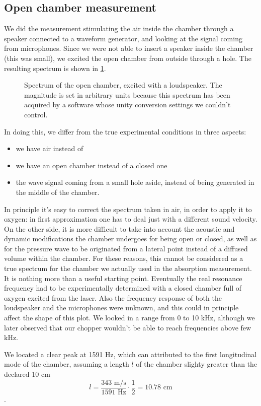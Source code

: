 	\subsection{Open chamber measurement}
We did the measurement stimulating the air inside the chamber through a speaker connected to a waveform generator, and looking at the signal coming from microphones. Since we were not able to insert a speaker inside the chamber (this was small), we excited the open chamber from outside through a hole. The resulting spectrum is shown in \cref{chamberplot}.
\begin{figure}[!t]\centering

\caption{Spectrum of the open chamber, excited with a loudspeaker. The magnitude is set in arbitrary units because this spectrum has been acquired by a software whose unity conversion settings we couldn't control.}
\label{chamberplot}
\end{figure}
In doing this, we differ from the true experimental conditions in three aspects:
\begin{itemize}
\item we have air instead of 
\item we have an open chamber instead of a closed one 
\item the wave signal coming from a small hole aside, instead of being generated in the middle of the chamber.
\end{itemize}

In principle it's easy to correct the spectrum taken in air, in order to apply it to oxygen: in first approximation one has to deal just with a different sound velocity. On the other side, it is more difficult to take into account the acoustic and dynamic modifications the chamber undergoes for being open or closed, as well as for the pressure wave to be originated from a lateral point instead of a diffused volume within the chamber. For these reasons, this cannot be considered as a true spectrum for the chamber we actually used in the absorption measurement. It is nothing more than a useful starting point. Eventually the real resonance frequency had to be experimentally determined with a closed chamber full of oxygen excited from the laser. Also the frequency response of both the loudspeaker and the microphones were unknown, and this could in principle affect the shape of this plot. We looked in a range from 0 to 10 kHz, although we later observed that our chopper wouldn't be able to reach frequencies above few kHz.

We located a clear peak at 1591 Hz, which can attributed to the first longitudinal mode of the chamber, assuming a length $l$ of the chamber slighty greater than the declared 10 cm$$l=\frac{343\mbox{ m/s}}{1591\mbox{ Hz}}\cdot\frac{1}{2}=10.78\mbox{ cm}$$.

